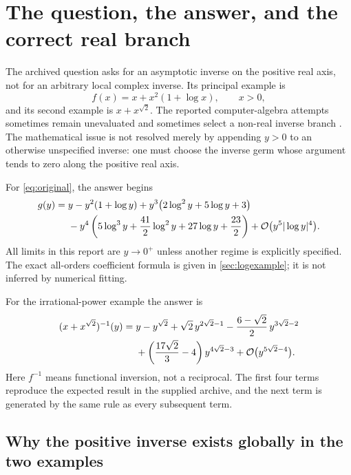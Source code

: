 \documentclass[11pt,a4paper]{article}
\theoremstyle{definition}
\theoremstyle{remark}
\newcommand{\OO}{\mathcal O}
\begin{document}
\tableofcontents
\newpage

\section{The question, the answer, and the correct real branch}
\label{sec:question}

The archived question asks for an asymptotic inverse on the positive real axis,
not for an arbitrary local complex inverse. Its principal example is
\begin{equation}\label{eq:original}
 f(x)=x+x^2(1+\log x),\qquad x>0,
\end{equation}
and its second example is $x+x^{\sqrt2}$. The reported computer-algebra attempts
sometimes remain unevaluated and sometimes select a non-real inverse branch
\cite{question}. The mathematical issue is not resolved merely by appending
$y>0$ to an otherwise unspecified inverse: one must choose the inverse germ
whose argument tends to zero along the positive real axis.

For \eqref{eq:original}, the answer begins
\begin{align}
 g(y)={}&y-y^2(1+\log y)
       +y^3\bigl(2\log^2y+5\log y+3\bigr)\notag\\
 &-y^4\left(5\log^3y+\frac{41}{2}\log^2y
                     +27\log y+\frac{23}{2}\right)
       +\OO\bigl(y^5|\log y|^4\bigr).
 \label{eq:log-answer}
\end{align}
All limits in this report are $y\to0^+$ unless another regime is explicitly
specified. The exact all-orders coefficient formula is given in
\cref{sec:logexample}; it is not inferred by numerical fitting.

For the irrational-power example the answer is
\begin{align}
 (x+x^{\sqrt2})^{-1}(y)
 ={}&y-y^{\sqrt2}+\sqrt2\,y^{2\sqrt2-1}
 -\frac{6-\sqrt2}{2}\,y^{3\sqrt2-2}\notag\\
 &+\left(\frac{17\sqrt2}{3}-4\right)y^{4\sqrt2-3}
 +\OO\bigl(y^{5\sqrt2-4}\bigr).
 \label{eq:irrational-answer}
\end{align}
Here $f^{-1}$ means functional inversion, not a reciprocal. The first four
terms reproduce the expected result in the supplied archive, and the next
term is generated by the same rule as every subsequent term.

\subsection{Why the positive inverse exists globally in the two examples}
\end{document}

